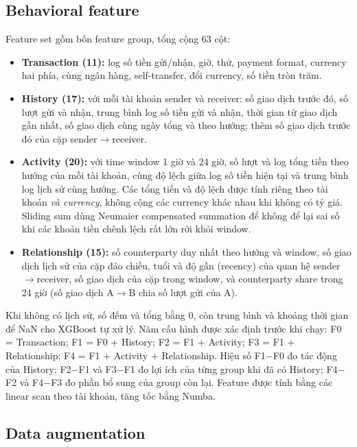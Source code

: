 \documentclass[sigconf,nonacm]{acmart}
\begin{document}
\subsection{Behavioral feature}

Feature set gồm bốn feature group, tổng cộng 63 cột:
\begin{itemize}
  \item \textbf{Transaction (11):} log số tiền gửi/nhận, giờ, thứ, payment format, currency hai phía, cùng ngân hàng,
  self-transfer, đổi currency, số tiền tròn trăm.
  \item \textbf{History (17):} với mỗi tài khoản sender và receiver: số giao dịch trước đó, số lượt gửi và nhận, trung
  bình log số tiền gửi và nhận, thời gian từ giao dịch gần nhất, số giao dịch cùng ngày tổng và theo hướng; thêm số
  giao dịch trước đó của cặp sender$\to$receiver.
  \item \textbf{Activity (20):} với time window 1 giờ và 24 giờ, số lượt và log tổng tiền theo hướng của mỗi tài
  khoản, cùng độ lệch giữa log số tiền hiện tại và trung bình log lịch sử cùng hướng. Các tổng tiền và độ lệch được
  tính riêng theo tài khoản \emph{và currency}, không cộng các currency khác nhau khi không có tỷ giá. Sliding sum dùng
  Neumaier compensated summation để không để lại sai số khi các khoản tiền chênh lệch rất lớn rời khỏi window.
  \item \textbf{Relationship (15):} số counterparty duy nhất theo hướng và window, số giao dịch lịch sử của cặp đảo
  chiều, tuổi và độ gần (recency) của quan hệ sender$\to$receiver, số giao dịch của cặp trong window, và counterparty
  share trong 24 giờ (số giao dịch A$\to$B chia số lượt gửi của A).
\end{itemize}
Khi không có lịch sử, số đếm và tổng bằng 0, còn trung bình và khoảng thời gian để NaN cho XGBoost tự xử lý. Năm cấu
hình được xác định trước khi chạy: F0 = Transaction; F1 = F0 + History; F2 = F1 + Activity; F3 = F1 + Relationship;
F4 = F1 + Activity + Relationship. Hiệu số F1$-$F0 đo tác động của History; F2$-$F1 và F3$-$F1 đo lợi ích của từng
group khi đã có History; F4$-$F2 và F4$-$F3 đo phần bổ sung của group còn lại. Feature được tính bằng các linear scan
theo tài khoản, tăng tốc bằng Numba.

\subsection{Data augmentation}
\end{document}
